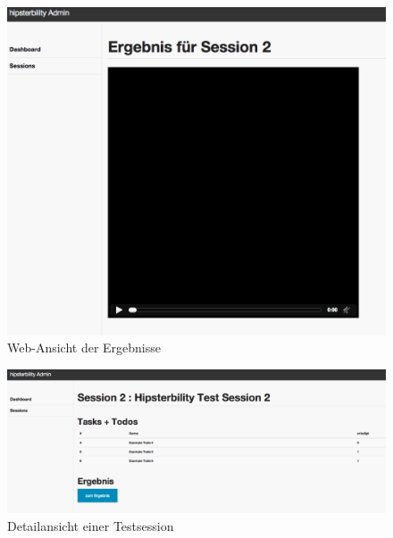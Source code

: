 \begin{figure}[h!]
	\centering
		\includegraphics[width=\linewidth,keepaspectratio]{img/session-result-page.png}
	\caption{Web-Ansicht der Ergebnisse}
	\label{fig: session-result-page}
\end{figure}
\newpage
\begin{figure}[h!]
	\centering
		\includegraphics[width=\linewidth,keepaspectratio]{img/session-detail-page.png}
	\caption{Detailansicht einer Testsession}
	\label{fig: session-detail-page}
\end{figure}

